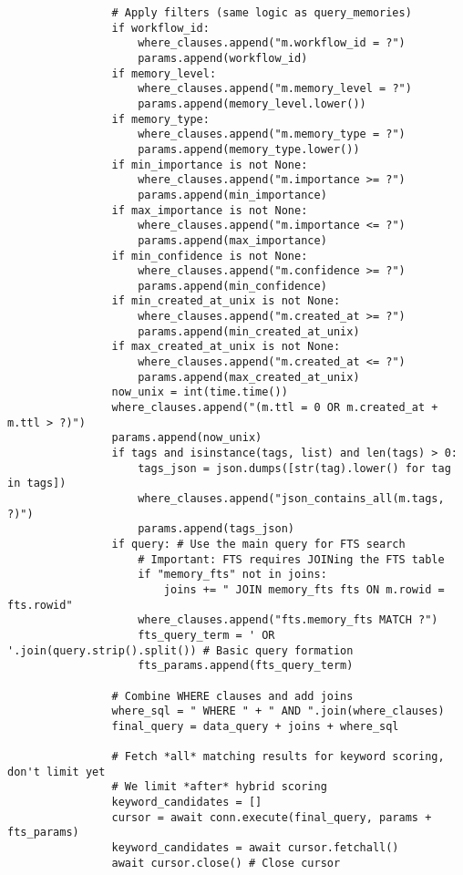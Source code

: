 \documentclass[12pt,a4paper]{article}
\begin{document}
\begin{pageablecode}
\begin{verbatim}
                # Apply filters (same logic as query_memories)
                if workflow_id:
                    where_clauses.append("m.workflow_id = ?")
                    params.append(workflow_id)
                if memory_level:
                    where_clauses.append("m.memory_level = ?")
                    params.append(memory_level.lower())
                if memory_type:
                    where_clauses.append("m.memory_type = ?")
                    params.append(memory_type.lower())
                if min_importance is not None:
                    where_clauses.append("m.importance >= ?")
                    params.append(min_importance)
                if max_importance is not None:
                    where_clauses.append("m.importance <= ?")
                    params.append(max_importance)
                if min_confidence is not None:
                    where_clauses.append("m.confidence >= ?")
                    params.append(min_confidence)
                if min_created_at_unix is not None:
                    where_clauses.append("m.created_at >= ?")
                    params.append(min_created_at_unix)
                if max_created_at_unix is not None:
                    where_clauses.append("m.created_at <= ?")
                    params.append(max_created_at_unix)
                now_unix = int(time.time())
                where_clauses.append("(m.ttl = 0 OR m.created_at + m.ttl > ?)")
                params.append(now_unix)
                if tags and isinstance(tags, list) and len(tags) > 0:
                    tags_json = json.dumps([str(tag).lower() for tag in tags])
                    where_clauses.append("json_contains_all(m.tags, ?)")
                    params.append(tags_json)
                if query: # Use the main query for FTS search
                    # Important: FTS requires JOINing the FTS table
                    if "memory_fts" not in joins:
                        joins += " JOIN memory_fts fts ON m.rowid = fts.rowid"
                    where_clauses.append("fts.memory_fts MATCH ?")
                    fts_query_term = ' OR '.join(query.strip().split()) # Basic query formation
                    fts_params.append(fts_query_term)

                # Combine WHERE clauses and add joins
                where_sql = " WHERE " + " AND ".join(where_clauses)
                final_query = data_query + joins + where_sql

                # Fetch *all* matching results for keyword scoring, don't limit yet
                # We limit *after* hybrid scoring
                keyword_candidates = []
                cursor = await conn.execute(final_query, params + fts_params)
                keyword_candidates = await cursor.fetchall()
                await cursor.close() # Close cursor


\end{verbatim}
\end{pageablecode}
\end{document}

